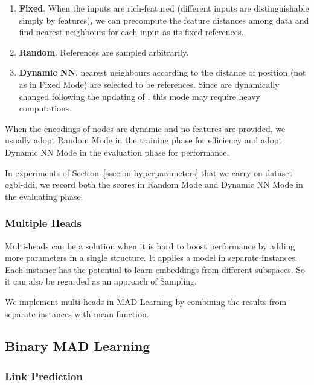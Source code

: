 \documentclass{article}
\begin{document}
\begin{enumerate}
\item
  \textbf{Fixed}. When the inputs are rich-featured (different inputs
  are distinguishable simply by features), we can precompute the feature
  distances among data and find  nearest neighbours for each input
  as its fixed references.
\item
  \textbf{Random}. References are sampled arbitrarily.
\item
  \textbf{Dynamic NN}.  nearest neighbours according to the
  distance of position  (not  as in Fixed Mode) are
  selected to be references. Since  are dynamically changed
  following the updating of , this mode may require heavy
  computations.
\end{enumerate}

When the encodings of nodes are dynamic and no features
are provided, we usually adopt Random Mode in the training phase
for efficiency and adopt Dynamic NN Mode in the evaluation phase
for performance.

In experiments of Section~\ref{ssec:on-hyperparameters} that we carry on
dataset ogbl-ddi, we record both the scores in Random Mode and Dynamic NN
Mode in the evaluating phase.

\hypertarget{multiple-heads}{\subsubsection{Multiple Heads}\label{sssec:multiple-heads}}

Multi-heads can be a solution when it is
hard to boost performance by adding more parameters in a single
structure. It applies a model in separate instances. Each instance has
the potential to learn embeddings from different subspaces. So it can
also be regarded as an approach of Sampling.

We implement multi-heads in MAD Learning by combining the results from
separate instances with mean function.

\hypertarget{binary-mad-learning}{\subsection{Binary MAD Learning}\label{ssec:binary-mad-learning}}

\hypertarget{link-prediction}{\subsubsection{Link Prediction}\label{sssec:link-prediction}}
\end{document}
